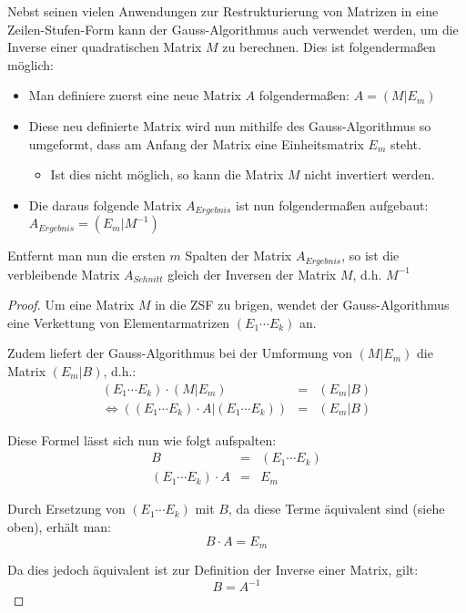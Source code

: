 Nebst seinen vielen Anwendungen zur Restrukturierung von Matrizen in eine Zeilen-Stufen-Form kann der Gauss-Algorithmus auch verwendet werden, um die Inverse einer quadratischen Matrix $M$ zu berechnen.
Dies ist folgendermaßen möglich:

\begin{itemize}
\item Man definiere zuerst eine neue Matrix $A$ folgendermaßen:
$A = (M|E_m)$
\item Diese neu definierte Matrix wird nun mithilfe des Gauss-Algorithmus so umgeformt, dass am Anfang der Matrix eine Einheitsmatrix $E_m$ steht.
\begin{itemize}
\item Ist dies nicht möglich, so kann die Matrix $M$ nicht invertiert werden.
\end{itemize}
\item Die daraus folgende Matrix $A_{Ergebnis}$ ist nun folgendermaßen aufgebaut: $A_{Ergebnis} = (E_m|M^{-1})$
\end{itemize}
Entfernt man nun die ersten $m$ Spalten der Matrix $A_{Ergebnis}$, so ist die verbleibende Matrix $A_{Schnitt}$ gleich der Inversen der Matrix $M$, d.h. $M^{-1}$

\begin{proof}
Um eine Matrix $M$ in die ZSF zu brigen, wendet der Gauss-Algorithmus eine Verkettung von Elementarmatrizen $(E_1 \cdots E_k)$ an.

Zudem liefert der Gauss-Algorithmus bei der Umformung von $(M|E_m)$ die Matrix $(E_m|B)$, d.h.: 
\begin{eqnarray*}
 (E_1 \cdots E_k) \cdot (M|E_m) &=& (E_m|B) \\
 \Leftrightarrow 
 ((E_1 \cdots E_k) \cdot A | (E_1 \cdots E_k)) &=& (E_m|B)
\end{eqnarray*}

Diese Formel lässt sich nun wie folgt aufspalten:
\begin{eqnarray*}
 B &=& (E_1 \cdots E_k) \\
(E_1 \cdots E_k) \cdot A &=& E_m
\end{eqnarray*}

Durch Ersetzung von $(E_1\cdots E_k)$ mit $B$, da diese Terme äquivalent sind (siehe oben), erhält man:
\[ B\cdot A = E_m \]

Da dies jedoch äquivalent ist zur Definition der Inverse einer Matrix, gilt:
\[ B=A^{-1}\]

\end{proof}